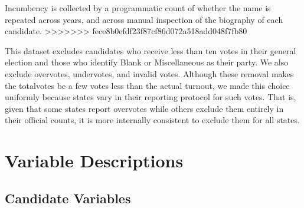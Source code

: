 \documentclass[12pt]{article}
\begin{document}
Incumbency is collected by a programmatic count of whether the name is repeated across years, and across manual inspection of the biography of each candidate.
>>>>>>> fece8b0efdf23f87cf86d072a518add048f7fb80

This dataset excludes candidates who receive less than ten votes in their general election and those who identify Blank or Miscellaneous as their party.
We also exclude overvotes, undervotes, and invalid votes.
Although these removal makes the totalvotes be a few votes less than the actual turnout, we made this choice uniformly because states vary in their reporting protocol for such votes. That is, given that some states report overvotes while others exclude them entirely in their official counts, it is more internally consistent to exclude them for all states.

\clearpage
\section{Variable Descriptions}

\subsection{Candidate Variables}
\end{document}
